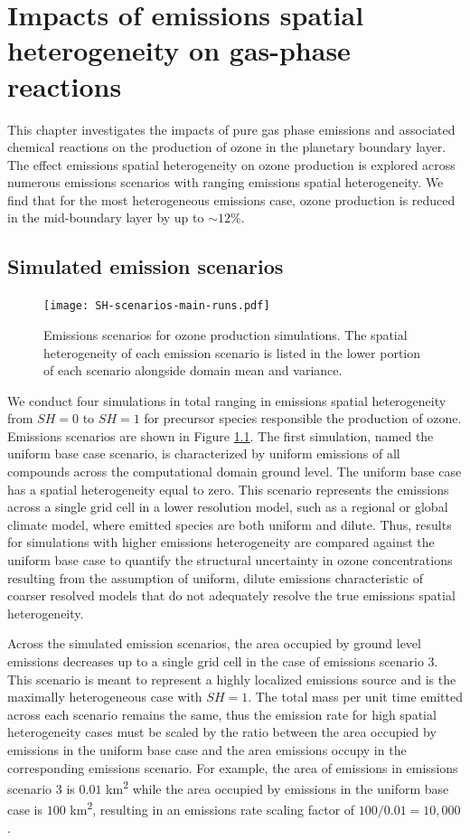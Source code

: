 \chapter{Impacts of emissions spatial heterogeneity on gas-phase reactions}

This chapter investigates the impacts of pure gas phase emissions and associated chemical reactions on the production of ozone in the planetary boundary layer. The effect emissions spatial heterogeneity on ozone production is explored across numerous emissions scenarios with ranging emissions spatial heterogeneity. We find that for the most heterogeneous emissions case, ozone production is reduced in the mid-boundary layer by up to $\sim12\%$.

\section{Simulated emission scenarios}

\begin{figure}[h]
	\centering
	\texttt{[image: SH-scenarios-main-runs.pdf]}
	\caption{Emissions scenarios for ozone production simulations. The spatial heterogeneity of each emission scenario is listed in the lower portion of each scenario alongside domain mean and variance.}
	\label{fig:ozone-emission-patterns}
\end{figure}

We conduct four simulations in total ranging in emissions spatial heterogeneity from $SH=0$ to $SH=1$ for precursor species responsible the production of ozone. Emissions scenarios are shown in Figure \ref{fig:ozone-emission-patterns}. The first simulation, named the uniform base case scenario, is characterized by uniform emissions of all compounds across the computational domain ground level. The uniform base case has a spatial heterogeneity equal to zero. This scenario represents the emissions across a single grid cell in a lower resolution model, such as a regional or global climate model, where emitted species are both uniform and dilute. Thus, results for simulations with higher emissions heterogeneity are compared against the uniform base case to quantify the structural uncertainty in ozone concentrations resulting from the assumption of uniform, dilute emissions characteristic of coarser resolved models that do not adequately resolve the true emissions spatial heterogeneity.  

Across the simulated emission scenarios, the area occupied by ground level emissions decreases up to a single grid cell in the case of emissions scenario 3. This scenario is meant to represent a highly localized emissions source and is the maximally heterogeneous case with $SH=1$. The total mass per unit time emitted across each scenario remains the same, thus the emission rate for high spatial heterogeneity cases must be scaled by the ratio between the area occupied by emissions in the uniform base case and the area emissions occupy in the corresponding emissions scenario. For example, the area of emissions in emissions scenario 3 is $0.01$ \si{km^2} while the area occupied by emissions in the uniform base case is  $100$ \si{km^2}, resulting in an emissions rate scaling factor of $100/0.01 = 10,000$. 

